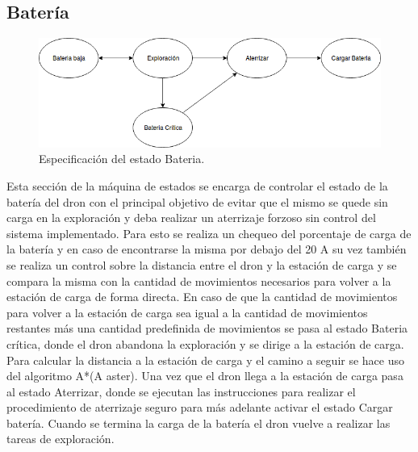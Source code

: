 \subsection {Batería}


\begin{figure}[h!]
	\label{fig:comp}
	\includegraphics[width=.8\textwidth]{imagenes/chap5/image5}
	\caption{Especificación del estado Bateria.}
\end{figure}

Esta sección de la máquina de estados se encarga de controlar el estado de la batería del dron con el principal objetivo de evitar que el mismo se quede sin carga en la exploración y deba realizar un aterrizaje forzoso sin control del sistema implementado.
Para esto se realiza un chequeo del porcentaje de carga de la  batería y en caso de encontrarse la misma por debajo del 20%
A su vez también se realiza un control sobre la distancia entre el dron y la estación de carga y se compara la misma con la cantidad de movimientos necesarios para volver a la estación de carga de forma directa. En caso de que la cantidad de movimientos para volver a la estación de carga sea igual a la cantidad de movimientos restantes más una cantidad predefinida de movimientos se pasa al estado Bateria crítica, donde el dron abandona la exploración y se dirige a la estación de carga. 
Para calcular la distancia a la estación de carga y el camino a seguir se hace uso del algoritmo A*(A aster).
Una vez que el dron llega a la estación de carga pasa al estado Aterrizar, donde se ejecutan las instrucciones para realizar el procedimiento de aterrizaje seguro para más adelante activar el estado Cargar batería. Cuando se termina la carga de la batería el dron vuelve a realizar las tareas de exploración.
